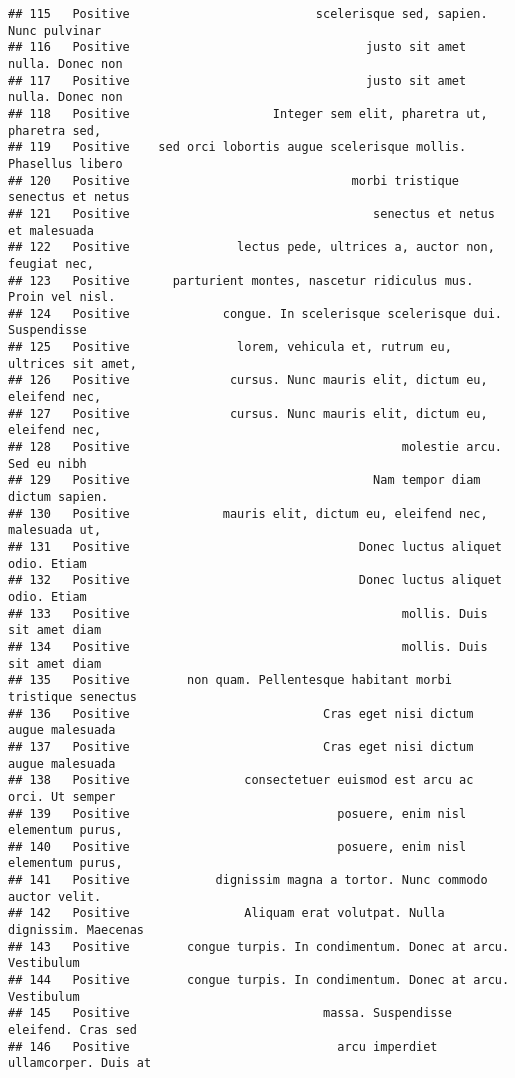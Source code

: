 \documentclass[
]{article}
\begin{document}
\begin{verbatim}
## 115   Positive                          scelerisque sed, sapien. Nunc pulvinar
## 116   Positive                                 justo sit amet nulla. Donec non
## 117   Positive                                 justo sit amet nulla. Donec non
## 118   Positive                    Integer sem elit, pharetra ut, pharetra sed,
## 119   Positive    sed orci lobortis augue scelerisque mollis. Phasellus libero
## 120   Positive                               morbi tristique senectus et netus
## 121   Positive                                  senectus et netus et malesuada
## 122   Positive               lectus pede, ultrices a, auctor non, feugiat nec,
## 123   Positive      parturient montes, nascetur ridiculus mus. Proin vel nisl.
## 124   Positive             congue. In scelerisque scelerisque dui. Suspendisse
## 125   Positive               lorem, vehicula et, rutrum eu, ultrices sit amet,
## 126   Positive              cursus. Nunc mauris elit, dictum eu, eleifend nec,
## 127   Positive              cursus. Nunc mauris elit, dictum eu, eleifend nec,
## 128   Positive                                      molestie arcu. Sed eu nibh
## 129   Positive                                  Nam tempor diam dictum sapien.
## 130   Positive             mauris elit, dictum eu, eleifend nec, malesuada ut,
## 131   Positive                                Donec luctus aliquet odio. Etiam
## 132   Positive                                Donec luctus aliquet odio. Etiam
## 133   Positive                                      mollis. Duis sit amet diam
## 134   Positive                                      mollis. Duis sit amet diam
## 135   Positive        non quam. Pellentesque habitant morbi tristique senectus
## 136   Positive                           Cras eget nisi dictum augue malesuada
## 137   Positive                           Cras eget nisi dictum augue malesuada
## 138   Positive                consectetuer euismod est arcu ac orci. Ut semper
## 139   Positive                             posuere, enim nisl elementum purus,
## 140   Positive                             posuere, enim nisl elementum purus,
## 141   Positive            dignissim magna a tortor. Nunc commodo auctor velit.
## 142   Positive                Aliquam erat volutpat. Nulla dignissim. Maecenas
## 143   Positive        congue turpis. In condimentum. Donec at arcu. Vestibulum
## 144   Positive        congue turpis. In condimentum. Donec at arcu. Vestibulum
## 145   Positive                           massa. Suspendisse eleifend. Cras sed
## 146   Positive                             arcu imperdiet ullamcorper. Duis at

\end{verbatim}
\end{document}
